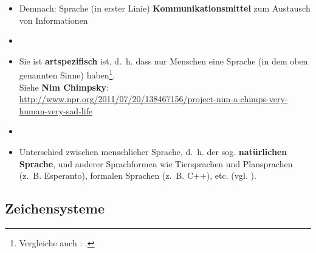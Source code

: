 
\begin{frame}

\begin{itemize}
	\item<1-> Demnach: Sprache (in erster Linie) \textbf{Kommunikationsmittel} zum Austausch von Informationen
	\item[]
	\item<2-> Sie ist \textbf{artspezifisch} ist, d.~h. dass nur Menschen eine Sprache (in dem oben genannten Sinne) haben\footnote{Vergleiche auch \citet{Bussmann83a}: .}.\\
	Siehe \textbf{Nim Chimpsky}:\\
	\url{http://www.npr.org/2011/07/20/138467156/project-nim-a-chimps-very-human-very-sad-life}
	\item[]
	\item<3-> Unterschied zwischen menschlicher Sprache, d.~h. der sog. \textbf{natürlichen Sprache}, und anderer Sprachformen wie Tiersprachen und Plansprachen (z.~B. Esperanto), formalen Sprachen (z.~B. C++), etc. (vgl. \citet{Thuemmel00a}).\
\end{itemize}		

\end{frame}


%
\subsection{Zeichensysteme}
	
